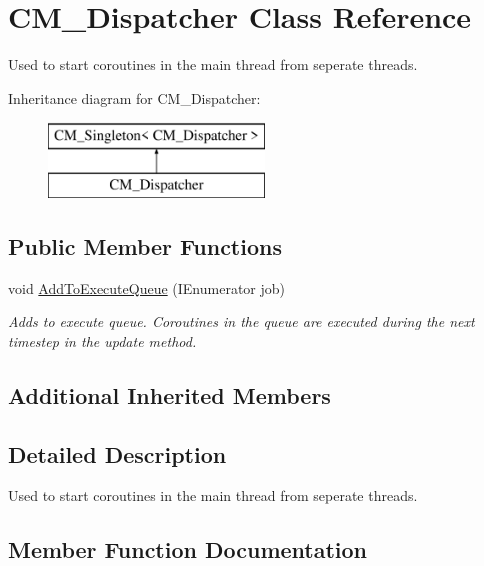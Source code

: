 \hypertarget{class_c_m___dispatcher}{}\section{C\+M\+\_\+\+Dispatcher Class Reference}
\label{class_c_m___dispatcher}


Used to start coroutines in the main thread from seperate threads.  


Inheritance diagram for C\+M\+\_\+\+Dispatcher\+:\begin{figure}[H]
\begin{center}
\leavevmode
\includegraphics[height=2.000000cm]{class_c_m___dispatcher}
\end{center}
\end{figure}
\subsection*{Public Member Functions}
\begin{DoxyCompactItemize}
\item 
void \hyperlink{class_c_m___dispatcher_a1cdbca41b92b6d2d9bdca7c989c96b2a}{Add\+To\+Execute\+Queue} (I\+Enumerator job)
\begin{DoxyCompactList}\small\item\em Adds to execute queue. Coroutines in the queue are executed during the next timestep in the update method. \end{DoxyCompactList}\end{DoxyCompactItemize}
\subsection*{Additional Inherited Members}


\subsection{Detailed Description}
Used to start coroutines in the main thread from seperate threads. 



\subsection{Member Function Documentation}
\hypertarget{class_c_m___dispatcher_a1cdbca41b92b6d2d9bdca7c989c96b2a}{}
